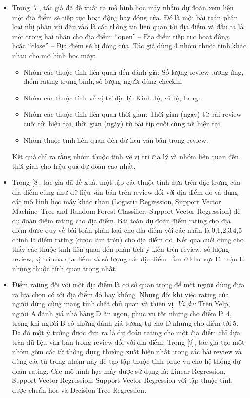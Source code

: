 \documentclass[12pt]{extarticle}
\begin{document}
			\begin{itemize}
				\item Trong [7], tác giả đã đề xuất ra mô hình học máy nhằm dự đoán xem liệu một địa điểm sẽ tiếp tục hoạt động hay đóng cửa. Đó là một bài toán phân loại nhị phân với đầu vào là các thông tin liên quan tới địa điểm và đầu ra là một trong hai nhãn cho địa điểm: “open” – Địa điểm tiếp tục hoạt động, hoặc “close” – Địa điểm sẽ bị đóng cửa. Tác giả dùng 4 nhóm thuộc tính khác nhau cho mô hình học máy:
					\begin{itemize}
						\item Nhóm các thuộc tính liên quan đến đánh giá: Số lượng review tương ứng, điểm rating trung bình, số lượng người dùng checkin.
						\item Nhóm các thuộc tính về vị trí địa lý: Kinh độ, vĩ độ, bang.
						\item Nhóm các thuộc tính liên quan thời gian: Thời gian (ngày) từ bài review cuối tới hiện tại, thời gian (ngày) từ bài tip cuối cùng tới hiện tại.
						\item Nhóm thuộc tính liên quan đến dữ liệu văn bản trong review.
					\end{itemize}
					Kết quả chỉ ra rằng nhóm thuộc tính về vị trí địa lý và nhóm liên quan đến thời gian cho hiệu quả dự đoán cao nhất.
				\item Trong [8], tác giả đã đề xuất một tập các thuộc tính dựa trên đặc trưng của địa điểm cũng như dữ liệu văn bản trên review đối với địa điểm đó và dùng các mô hình học máy khác nhau (Logistic Regression, Support Vector Machine, Tree and Random Forest Classifier, Support Vector Regression) để dự đoán điểm rating cho địa điểm. Bài toán dự đoán điểm rating cho địa điểm được quy về bài toán phân loại cho địa điểm với các nhãn là 0,1,2,3,4,5 chính là điểm rating (được làm tròn) cho địa điểm đó. Kết quả cuối cùng cho thấy các thuộc tính liên quan đến phân tích ý kiến trên review, số lượng review, vị trí của địa điểm và số lượng các địa điểm nằm ở khu vực lân cận là những thuộc tính quan trọng nhất.
				\item Điểm rating đối với một địa điểm là cơ sở quan trọng để một người dùng đưa ra lựa chọn có tới địa điểm đó hay không. Nhưng đôi khi việc rating của người dùng cũng mang tính chất chủ quan và thiên vị. \textit{Ví dụ:} Trên Yelp, người A đánh giá nhà hàng D ăn ngon, phục vụ tốt nhưng cho điểm là 4, trong khi người B có những đánh giá tương tự cho D nhưng cho điểm tới 5. Do đó một ý tưởng được đưa ra là dự đoán rating cho một địa điểm chỉ dựa trên dữ liệu văn bản trong review đối với địa điểm. Trong [9], tác giả tạo một nhóm gồm các từ thông dụng thường xuất hiện nhất trong các bài review và dùng các từ trong nhóm này để tạo tập thuộc tính phục vụ cho hệ thống dự đoán rating. Các mô hình học máy được sử dụng là: Linear Regression, Support Vector Regression, Support Vector Regression với tập thuộc tính được chuẩn hóa và Decision Tree Regression.

\end{itemize}
\end{document}
